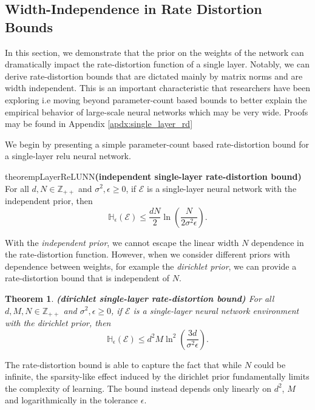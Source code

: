 \documentclass[twoside,11pt]{article}
\newtheorem{theorem}{Theorem}
\def\environment{\mathcal{E}}
\def\H{\mathbb{H}}
\begin{document}
\subsection{Width-Independence in Rate Distortion Bounds}
\label{sec:single_layer_rd}

In this section, we demonstrate that the prior on the weights of the network can dramatically impact the rate-distortion function of a single layer. Notably, we can derive rate-distortion bounds that are dictated mainly by matrix norms and are width independent. This is an important characteristic that researchers have been exploring i.e moving beyond parameter-count based bounds to better explain the empirical behavior of large-scale neural networks which may be very wide. Proofs may be found in Appendix \ref{apdx:single_layer_rd}

We begin by presenting a simple parameter-count based rate-distortion bound for a single-layer relu neural network.

\begin{restatable}{theorem}{pLayerReLUNN}{\bf (independent single-layer rate-distortion bound)}
    \label{th:relu_singlelayer_rd}
    For all $d, N \in \mathbb{Z}_{++}$ and $\sigma^2, \epsilon \geq 0$, if $\environment$ is a single-layer neural network with the independent prior, then
    $$\H_\epsilon(\environment) \leq \frac{dN}{2}\ln\left(\frac{N}{2\sigma^2\epsilon}\right).$$
\end{restatable}

With the \emph{independent prior}, we cannot escape the linear width $N$ dependence in the rate-distortion function. However, when we consider different priors with dependence between weights, for example the \emph{dirichlet prior}, we can provide a rate-distortion bound that is independent of $N$.

\begin{theorem}{\bf (dirichlet single-layer rate-distortion bound)}
    \label{th:relu_nonparam_rd}
    For all $d, M, N\in\mathbb{Z}_{++}$ and $\sigma^2, \epsilon \geq 0$, if $\environment$ is a single-layer neural network environment with the dirichlet prior, then
    $$\H_\epsilon(\environment) \leq d^2M\ln^2\left(\frac{3d}{\sigma^2\epsilon}\right).$$
\end{theorem}

The rate-distortion bound is able to capture the fact that while $N$ could be infinite, the sparsity-like effect induced by the dirichlet prior fundamentally limits the complexity of learning. The bound instead depends only linearly on $d^2$, $M$ and logarithmically in the tolerance $\epsilon$.
\end{document}
